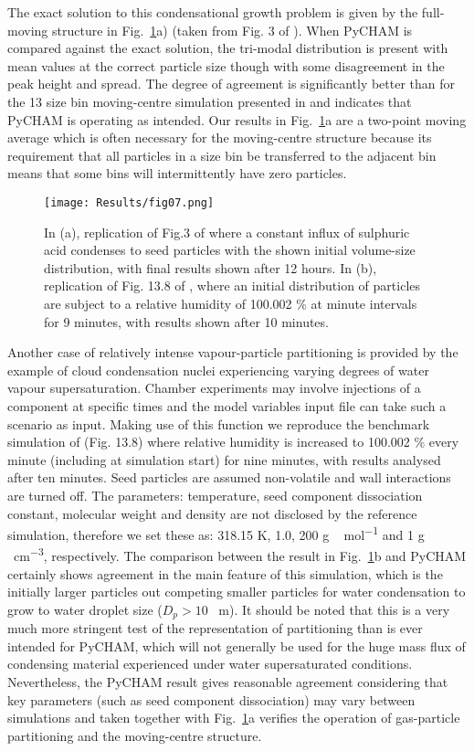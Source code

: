\documentclass[gmd, manuscript]{copernicus}
\begin{document}
The exact solution to this condensational growth problem is given by the full-moving structure in Fig.~\ref{fig:mov_cen_test}a) (taken from Fig. 3 of \citet{Zhang1999}).  When PyCHAM is compared against the exact solution, the tri-modal distribution is present with mean values at the correct particle size though with some disagreement in the peak height and spread.  The degree of agreement is significantly better than for the 13 size bin moving-centre simulation presented in \citet{Zhang1999} and indicates that PyCHAM is operating as intended.  Our results in Fig.~\ref{fig:mov_cen_test}a are a two-point moving average which is often necessary for the moving-centre structure because its requirement that all particles in a size bin be transferred to the adjacent bin means that some bins will intermittently have zero particles.

\begin{figure}[t]
\texttt{[image: Results/fig07.png]}
\caption{In (a), replication of Fig.3 of \citet{Zhang1999} where a constant influx of sulphuric acid condenses to seed particles with the shown initial volume-size distribution, with final results shown after 12 hours.  In (b), replication of Fig. 13.8 of \citet{Jacobson2005}, where an initial distribution of particles are subject to a relative humidity of 100.002 \% at minute intervals for 9 minutes, with results shown after 10 minutes.}
\label{fig:mov_cen_test}
\end{figure}

Another case of relatively intense vapour-particle partitioning is provided by the example of cloud condensation nuclei experiencing varying degrees of water vapour supersaturation.  Chamber experiments may involve injections of a component at specific times and the model variables input file can take such a scenario as input.  Making use of this function we reproduce the benchmark simulation of \citet{Jacobson2005} (Fig. 13.8) where relative humidity is increased to 100.002 \% every minute (including at simulation start) for nine minutes, with results analysed after ten minutes.  Seed particles are assumed non-volatile and wall interactions are turned off.  The parameters: temperature, seed component dissociation constant, molecular weight and density are not disclosed by the reference simulation, therefore we set these as: 318.15 \unit{K}, 1.0, 200 \unit{g\,mol^{-1}} and 1 \unit{g\,cm^{-3}}, respectively.  The comparison between the \citet{Jacobson2005} result in Fig.~\ref{fig:mov_cen_test}b and PyCHAM certainly shows agreement in the main feature of this simulation, which is the initially larger particles out competing smaller particles for water condensation to grow to water droplet size ($D_{p}>10$ \unit{\mu m}).  It should be noted that this is a very much more stringent test of the representation of partitioning than is ever intended for PyCHAM, which will not generally be used for the huge mass flux of condensing material experienced under water supersaturated conditions.  Nevertheless, the PyCHAM result gives reasonable agreement considering that key parameters (such as seed component dissociation) may vary between simulations and taken together with Fig.~\ref{fig:mov_cen_test}a verifies the operation of gas-particle partitioning and the moving-centre structure.
\end{document}
